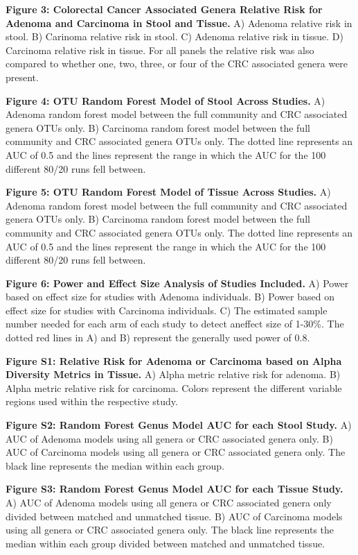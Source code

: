 \documentclass[12pt,]{article}
\begin{document}
\textbf{Figure 3: Colorectal Cancer Associated Genera Relative Risk for
Adenoma and Carcinoma in Stool and Tissue.} A) Adenoma relative risk in
stool. B) Carinoma relative risk in stool. C) Adenoma relative risk in
tissue. D) Carcinoma relative risk in tissue. For all panels the
relative risk was also compared to whether one, two, three, or four of
the CRC associated genera were present.

\textbf{Figure 4: OTU Random Forest Model of Stool Across Studies.} A)
Adenoma random forest model between the full community and CRC
associated genera OTUs only. B) Carcinoma random forest model between
the full community and CRC associated genera OTUs only. The dotted line
represents an AUC of 0.5 and the lines represent the range in which the
AUC for the 100 different 80/20 runs fell between.

\textbf{Figure 5: OTU Random Forest Model of Tissue Across Studies.} A)
Adenoma random forest model between the full community and CRC
associated genera OTUs only. B) Carcinoma random forest model between
the full community and CRC associated genera OTUs only. The dotted line
represents an AUC of 0.5 and the lines represent the range in which the
AUC for the 100 different 80/20 runs fell between.

\textbf{Figure 6: Power and Effect Size Analysis of Studies Included.}
A) Power based on effect size for studies with Adenoma individuals. B)
Power based on effect size for studies with Carcinoma individuals. C)
The estimated sample number needed for each arm of each study to detect
aneffect size of 1-30\%. The dotted red lines in A) and B) represent the
generally used power of 0.8.

\newpage

\textbf{Figure S1: Relative Risk for Adenoma or Carcinoma based on Alpha
Diversity Metrics in Tissue.} A) Alpha metric relative risk for adenoma.
B) Alpha metric relative risk for carcinoma. Colors represent the
different variable regions used within the respective study.

\textbf{Figure S2: Random Forest Genus Model AUC for each Stool Study.}
A) AUC of Adenoma models using all genera or CRC associated genera only.
B) AUC of Carcinoma models using all genera or CRC associated genera
only. The black line represents the median within each group.

\textbf{Figure S3: Random Forest Genus Model AUC for each Tissue Study.}
A) AUC of Adenoma models using all genera or CRC associated genera only
divided between matched and unmatched tissue. B) AUC of Carcinoma models
using all genera or CRC associated genera only. The black line
represents the median within each group divided between matched and
unmatched tissue.
\end{document}
